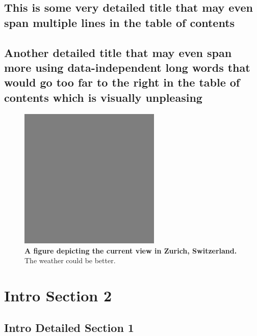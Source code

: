 \documentclass[pdftex, a4paper, oneside, 12pt, bibtotoc, idxtotoc ]{scrreprt}
\begin{document}
\subsection{This is some very detailed title that may even span multiple lines
in the table of contents}
\blindtext[2]
\subsection{Another detailed title that may even span more
using data-independent long words that would go too far to the right in the
table of contents which is visually unpleasing }
\blindtext[2]

\begin{figure}[tb]
  \center
  \includegraphics[width=0.6\textwidth]{dummy.png}
  \caption[A figure depicting the current view in Zurich, Switzerland]
  {  \textbf{A figure depicting the current view in Zurich, Switzerland.} The
  weather could be better.  }
  \label{fig:fig1}
\end{figure}

\section{Intro Section 2}
\blindtext[1]

\subsection{Intro Detailed Section 1}
\blindtext[2]
\end{document}
